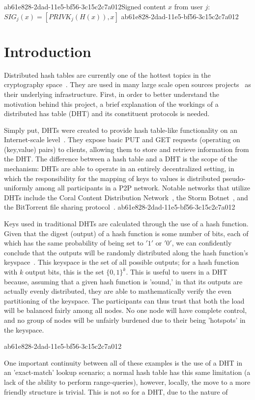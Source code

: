 \documentclass[12pt]{article}
\begin{document}
ab61e828-2dad-11e5-bf56-3c15c2c7a012Signed content $x$ from user $j$: $SIG_j(x) = \left[ PRIVK_j( H(x) ), x \right]$
ab61e828-2dad-11e5-bf56-3c15c2c7a012
\section{Introduction}
\par Distributed hash tables are currently one of the hottest topics in the cryptography space~\cite{Stoica:2001dj,Rowstron:2001ea,Ratnasamy:2001wn}. They are used in many large scale open sources projects~\cite{Freitas:2013tb,Xu:2010vs,Perfitt:2010fh} as their underlying infrastructure. First, in order to better understand the motivation behind this project, a brief explanation of the workings of a distributed has table (DHT) and its constituent protocols is needed.

\par Simply put, DHTs were created to provide hash table-like functionality on an Internet-scale level~\cite{Ratnasamy:2001wn}. They expose basic PUT and GET requests (operating on (key,value) pairs) to clients, allowing them to store and retrieve information from the DHT. The difference between a hash table and a DHT is the scope of the mechanism: DHTs are able to operate in an entirely decentralized setting, in which the responsibility for the mapping of keys to values is distributed pseudo-uniformly among all participants in a P2P network. Notable networks that utilize DHTs include the Coral Content Distribution Network~\cite{Freedman:2004vb}, the Storm Botnet~\cite{Holz:2008uk}, and the BitTorrent file sharing protocol~\cite{Cohen:y1_8mBnw}.
ab61e828-2dad-11e5-bf56-3c15c2c7a012
\par Keys used in traditional DHTs are calculated through the use of a hash function. Given that the digest (output) of a hash function is some number of bits, each of which has the same probability of being set to $'1'$ or $'0'$, we can confidently conclude that the outputs will be randomly distributed along the hash function's keyspace~. This keyspace is the set of all possible outputs; for a hash function with $k$ output bits, this is the set $\{0,1\}^k$. This is useful to users in a DHT because, assuming that a given hash function is 'sound,' in that its outputs are actually evenly distributed, they are able to mathematically verify the even partitioning of the keyspace. The participants can thus trust that both the load will be balanced fairly among all nodes. No one node will have complete control, and no group of nodes will be unfairly burdened due to their being 'hotspots' in the keyspace.~

ab61e828-2dad-11e5-bf56-3c15c2c7a012\par One important continuity between all of these examples is the use of a DHT in an 'exact-match' lookup scenario; a normal hash table has this same limitation (a lack of the ability to perform range-queries), however, locally, the move to a more friendly structure is trivial. This is not so for a DHT, due to the nature of
\printbibliography
\end{document}
